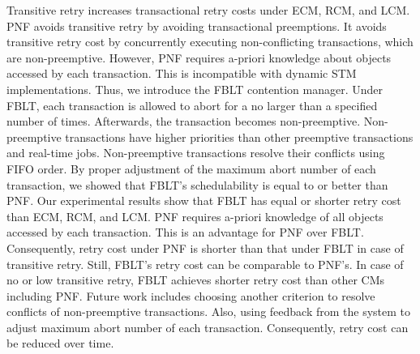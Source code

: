 \documentclass[conference]{IEEEtran}
\begin{document}
Transitive retry increases transactional retry costs under ECM, RCM, and LCM. PNF avoids transitive retry by avoiding transactional preemptions. It avoids transitive retry cost by concurrently executing non-conflicting transactions, which are non-preemptive. However, PNF requires a-priori knowledge about objects accessed by each transaction. This is incompatible with dynamic STM implementations. Thus, we introduce the FBLT contention manager. Under  FBLT, each transaction is allowed to abort for a no larger than a specified number of times. Afterwards, the transaction becomes non-preemptive. Non-preemptive transactions have higher priorities than other preemptive transactions and real-time jobs. Non-preemptive transactions resolve their conflicts using FIFO order. 
%
By proper adjustment of the maximum abort number of each transaction, we showed that FBLT's schedulability is equal to or better than PNF. 
%
Our experimental results show that FBLT has equal or shorter retry cost than ECM, RCM, and LCM. PNF requires a-priori knowledge of all objects accessed by each transaction. This is an advantage for PNF over FBLT. Consequently, retry cost under PNF is shorter than that under FBLT in case of transitive retry. Still, FBLT's retry cost can be comparable to PNF's. In case of no or low transitive retry, FBLT achieves shorter retry cost than other CMs including PNF. 
%
Future work includes choosing another criterion to resolve conflicts of non-preemptive transactions. Also, using feedback from the system to adjust maximum abort number of each transaction. Consequently, retry cost can be reduced over time.



\end{document}
